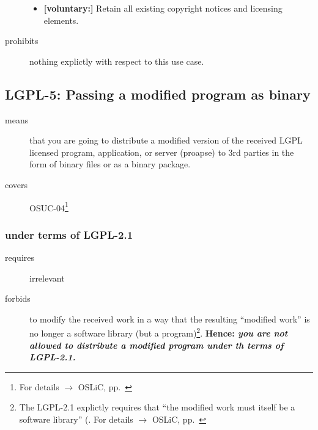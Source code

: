 \begin{description}
\begin{itemize}
  \item \textbf{[voluntary:]} Retain all existing copyright notices and
  licensing elements. 
  
 \end{itemize}
 
\item[prohibits] nothing explictly with respect to this use case.

\end{description}

\subsection{LGPL-5: Passing a modified program as binary}

\begin{description}
\item[means] that you are going to distribute a modified version of the received
LGPL licensed pro\-gram, application, or server (proapse) to 3rd parties in the
form of binary files or as a binary package.
\item[covers] OSUC-04\footnote{For details $\rightarrow$ OSLiC, pp.\ \pageref{OSUC-04-DEF}}
\end{description}

\subsubsection{under terms of LGPL-2.1}

\begin{description}
  \item[requires] irrelevant
  \item[forbids] to modify the received work in a way that the resulting
  \enquote{modified work} is no longer a software library (but a
  program)\footnote{The LGPL-2.1 explictly requires that \enquote{the modified
  work must itself be a software library} (\cite[cf.][\nopage wp.\
  §2a]{Lgpl21OsiLicense1999a}. For details $\rightarrow$ OSLiC, pp.\
  \pageref{para:libislib}}. \textbf{Hence: \emph{you are not allowed to
  distribute a modified program under th terms of LGPL-2.1.}}
\end{description}

